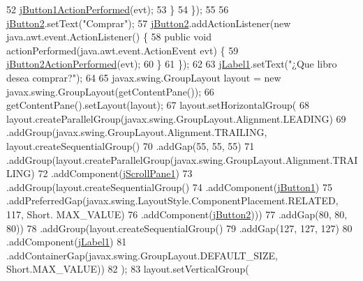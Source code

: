 \begin{DoxyCode}
52                 \mbox{\hyperlink{class_interfaz_package_1_1_busqueda_libro_a25a437966d236ff48463e2ce6a5d9c03}{jButton1ActionPerformed}}(evt);
53             \}
54         \});
55 
56         \mbox{\hyperlink{class_interfaz_package_1_1_busqueda_libro_a1cb7663746354ace608d7846c3d86105}{jButton2}}.setText(\textcolor{stringliteral}{"Comprar"});
57         \mbox{\hyperlink{class_interfaz_package_1_1_busqueda_libro_a1cb7663746354ace608d7846c3d86105}{jButton2}}.addActionListener(\textcolor{keyword}{new} java.awt.event.ActionListener() \{
58             \textcolor{keyword}{public} \textcolor{keywordtype}{void} actionPerformed(java.awt.event.ActionEvent evt) \{
59                 \mbox{\hyperlink{class_interfaz_package_1_1_busqueda_libro_afde7a423c97ad3cae7c3b1ea66ea54c2}{jButton2ActionPerformed}}(evt);
60             \}
61         \});
62 
63         \mbox{\hyperlink{class_interfaz_package_1_1_busqueda_libro_ae9603cba787d7c8cd78d9a35ac7c31ab}{jLabel1}}.setText(\textcolor{stringliteral}{"¿Que libro desea comprar?"});
64 
65         javax.swing.GroupLayout layout = \textcolor{keyword}{new} javax.swing.GroupLayout(getContentPane());
66         getContentPane().setLayout(layout);
67         layout.setHorizontalGroup(
68             layout.createParallelGroup(javax.swing.GroupLayout.Alignment.LEADING)
69             .addGroup(javax.swing.GroupLayout.Alignment.TRAILING, layout.createSequentialGroup()
70                 .addGap(55, 55, 55)
71                 .addGroup(layout.createParallelGroup(javax.swing.GroupLayout.Alignment.TRAILING)
72                     .addComponent(\mbox{\hyperlink{class_interfaz_package_1_1_busqueda_libro_a2c5f99da1566043c6ead6bf6bc702bfa}{jScrollPane1}})
73                     .addGroup(layout.createSequentialGroup()
74                         .addComponent(\mbox{\hyperlink{class_interfaz_package_1_1_busqueda_libro_a8bd603a21b300bd0b31210ae9756c361}{jButton1}})
75                         .addPreferredGap(javax.swing.LayoutStyle.ComponentPlacement.RELATED, 117, Short.
      MAX\_VALUE)
76                         .addComponent(\mbox{\hyperlink{class_interfaz_package_1_1_busqueda_libro_a1cb7663746354ace608d7846c3d86105}{jButton2}})))
77                 .addGap(80, 80, 80))
78             .addGroup(layout.createSequentialGroup()
79                 .addGap(127, 127, 127)
80                 .addComponent(\mbox{\hyperlink{class_interfaz_package_1_1_busqueda_libro_ae9603cba787d7c8cd78d9a35ac7c31ab}{jLabel1}})
81                 .addContainerGap(javax.swing.GroupLayout.DEFAULT\_SIZE, Short.MAX\_VALUE))
82         );
83         layout.setVerticalGroup(

\end{DoxyCode}
